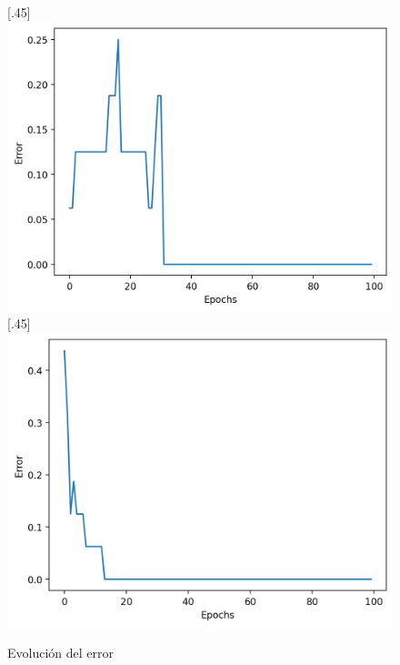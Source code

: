 \documentclass[12pt,a4paper]{article}
\begin{document}
\begin{figure}[H]
  [.45\linewidth]{
    \includegraphics[width=\linewidth]{img/5-training_error.png}
  }
  [.45\linewidth]{
    \includegraphics[width=\linewidth]{img/6-training_error.png}
  }
  \caption*{Evolución del error}
  \centering
\end{figure}
\end{document}
